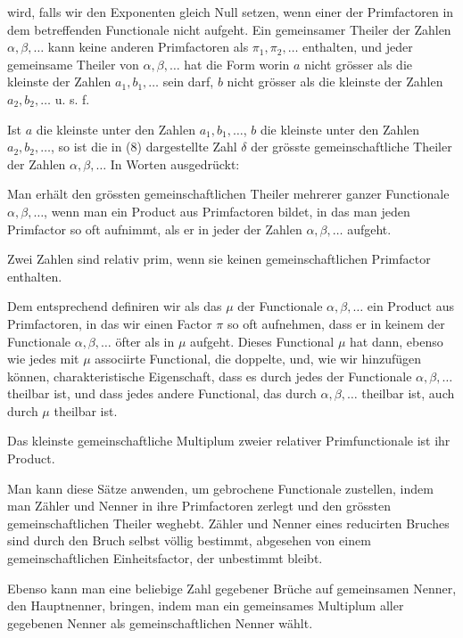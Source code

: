wird, falls wir den Exponenten gleich Null setzen, wenn einer der Primfactoren in dem betreffenden Functionale nicht aufgeht. Ein gemeinsamer Theiler der Zahlen $\alpha, \beta, \ldots$ kann keine anderen Primfactoren als $\pi_1, \pi_2, \ldots$ enthalten, und jeder gemeinsame Theiler von $\alpha, \beta, \ldots$ hat die Form
worin $a$ nicht grösser als die kleinste der Zahlen $a_1, b_1, \ldots$ sein darf, $b$ nicht grösser als die kleinste der Zahlen $a_2, b_2, \ldots$ u. s. f.

Ist $a$ die kleinste unter den Zahlen $a_1, b_1, \ldots$, $b$ die kleinste unter den Zahlen $a_2, b_2, \ldots$, so ist die in (8) dargestellte Zahl $\delta$ der grösste gemeinschaftliche Theiler der Zahlen $\alpha, \beta, \ldots$ In Worten ausgedrückt:

Man erhält den grössten gemeinschaftlichen Theiler mehrerer ganzer Functionale $\alpha, \beta, \ldots$, wenn man ein Product aus Primfactoren bildet, in das man jeden Primfactor so oft aufnimmt, als er in jeder der Zahlen $\alpha, \beta, \ldots$ aufgeht.

Zwei Zahlen sind relativ prim, wenn sie keinen gemeinschaftlichen Primfactor enthalten.

Dem entsprechend definiren wir als das  $\mu$ der Functionale $\alpha, \beta, \ldots$ ein Product aus Primfactoren, in das wir einen Factor $\pi$ so oft aufnehmen, dass er in keinem der Functionale $\alpha, \beta, \ldots$ öfter als in $\mu$ aufgeht. Dieses Functional $\mu$ hat dann, ebenso wie jedes mit $\mu$ associirte Functional, die doppelte, und, wie wir hinzufügen können, charakteristische Eigenschaft, dass es durch jedes der Functionale $\alpha, \beta, \ldots$ theilbar ist, und dass jedes andere Functional, das durch $\alpha, \beta, \ldots$ theilbar ist, auch durch $\mu$ theilbar ist.

Das kleinste gemeinschaftliche Multiplum zweier relativer Primfunctionale ist ihr Product.

Man kann diese Sätze anwenden, um gebrochene Functionale zustellen, indem man Zähler und Nenner in ihre Primfactoren zerlegt und den grössten gemeinschaftlichen Theiler weghebt. Zähler und Nenner eines reducirten Bruches sind durch den Bruch selbst völlig bestimmt, abgesehen von einem gemeinschaftlichen Einheitsfactor, der unbestimmt bleibt.

Ebenso kann man eine beliebige Zahl gegebener Brüche auf gemeinsamen Nenner, den Hauptnenner, bringen, indem man ein gemeinsames Multiplum aller gegebenen Nenner als gemeinschaftlichen Nenner wählt.
